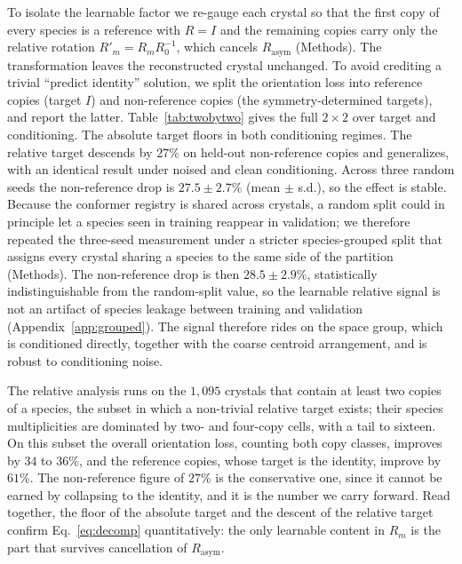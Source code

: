 \documentclass[10pt]{article}
\begin{document}
To isolate the learnable factor we re-gauge each crystal so that the first copy
of every species is a reference with $R=I$ and the remaining copies carry only
the relative rotation $R'_m = R_m R_0^{-1}$, which cancels $R_{\text{asym}}$
(Methods). The transformation leaves the reconstructed crystal unchanged. To
avoid crediting a trivial ``predict identity'' solution, we split the
orientation loss into reference copies (target $I$) and non-reference copies
(the symmetry-determined targets), and report the latter.
Table~\ref{tab:twobytwo} gives the full $2\times2$ over target and conditioning.
The absolute target floors in both conditioning regimes. The relative target
descends by $27\%$ on held-out non-reference copies and generalizes, with an
identical result under noised and clean conditioning. Across three random seeds
the non-reference drop is $27.5\pm2.7\%$ (mean $\pm$ s.d.), so the effect is
stable. Because the conformer registry is shared across crystals, a random split
could in principle let a species seen in training reappear in validation; we
therefore repeated the three-seed measurement under a stricter species-grouped
split that assigns every crystal sharing a species to the same side of the
partition (Methods). The non-reference drop is then $28.5\pm2.9\%$, statistically
indistinguishable from the random-split value, so the learnable relative signal
is not an artifact of species leakage between training and validation
(Appendix~\ref{app:grouped}). The signal therefore rides on the space group, which is conditioned
directly, together with the
coarse centroid arrangement, and is robust to conditioning noise.

The relative analysis runs on the $1{,}095$ crystals that contain at least two
copies of a species, the subset in which a non-trivial relative target exists;
their species multiplicities are dominated by two- and four-copy cells, with a
tail to sixteen. On this subset the overall orientation loss, counting both
copy classes, improves by $34$ to $36\%$, and the reference copies, whose target
is the identity, improve by $61\%$. The non-reference figure of $27\%$ is the
conservative one, since it cannot be earned by collapsing to the identity, and it
is the number we carry forward. Read together, the floor of the absolute target
and the descent of the relative target confirm Eq.~\eqref{eq:decomp}
quantitatively: the only learnable content in $R_m$ is the part that survives
cancellation of $R_{\text{asym}}$.
\end{document}
